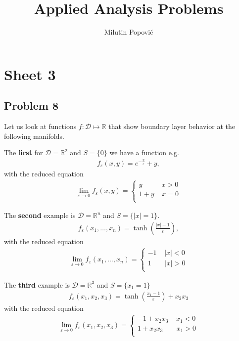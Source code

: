 \documentclass[a4paper]{article}
\title{Applied Analysis Problems}
\author{Milutin Popović}
\newcommand{\eps}{\varepsilon}
\begin{document}
\maketitle
\tableofcontents

\section{Sheet 3}
\subsection{Problem 8}
Let us look at functions $f: \mathcal{D} \mapsto \mathbb{R}$ that show
boundary layer behavior at the following manifolds.

The \textbf{first} for $\mathcal{D} = \mathbb{R}^2$ and $S = \{0\}$ we have a
function e.g.
\begin{align}
    f_{\eps}(x, y) = e^{-\frac{x}{\eps}} + y,
\end{align}
with the reduced equation
\begin{align}
    \lim_{\eps \rightarrow 0} f_{\eps}(x, y) =
    \begin{cases}
        y \;\;\;\;\;\;\;\;\;\; x > 0\\
        1+y \;\;\;\; x = 0\\
    \end{cases}
\end{align}

The \textbf{second} example is $\mathcal{D} = \mathbb{R}^n$ and $S = \{|x| = 1\}$.
\begin{align}
    f_\eps(x_1,\dots,x_n) = \tanh\left(\frac{|x| - 1}{\eps} \right),
\end{align}
with the reduced equation
\begin{align}
    \lim_{\eps \rightarrow 0} f_{\eps}(x_1,\dots, x_n) =
    \begin{cases}
        -1 \;\;\;\; |x| < 0\\
        1  \;\;\;\;\;\;\; |x| > 0\\
    \end{cases}
\end{align}

The \textbf{third} example is $\mathcal{D} = \mathbb{R}^3$ and $S = \{x_1 =
1\}$
\begin{align}
    f_\eps(x_1, x_2, x_3) = \tanh\left(\frac{x_1 - 1}{\eps}\right)+x_2x_3
\end{align}
with the reduced equation
\begin{align}
    \lim_{\eps \rightarrow 0} f_{\eps}(x_1,x_2,x_3) =
    \begin{cases}
        -1 + x_2x_3 \;\;\;\; x_1 < 0\\
        1 + x_2x_3 \;\;\;\;\;\;\; x_1 > 0\\
    \end{cases}
\end{align}
\end{document}
